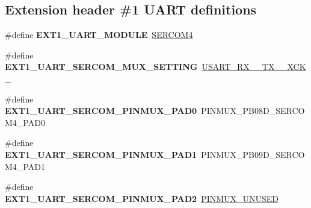 \subsection*{Extension header \#1 U\+A\+R\+T definitions}
\begin{DoxyCompactItemize}
\item 
\hypertarget{group__saml21__xplained__pro__features__group_ga0926bf9254087738e85b09e734c4e7ca}{}\#define {\bfseries E\+X\+T1\+\_\+\+U\+A\+R\+T\+\_\+\+M\+O\+D\+U\+L\+E}~\hyperlink{group___s_a_m_l21_j18_a__base_gad48343faa88820b8f552aa1eaf66f00a}{S\+E\+R\+C\+O\+M4}\label{group__saml21__xplained__pro__features__group_ga0926bf9254087738e85b09e734c4e7ca}

\item 
\hypertarget{group__saml21__xplained__pro__features__group_ga1a806a0ca2b2d26a4e884ad7c2d68b4d}{}\#define {\bfseries E\+X\+T1\+\_\+\+U\+A\+R\+T\+\_\+\+S\+E\+R\+C\+O\+M\+\_\+\+M\+U\+X\+\_\+\+S\+E\+T\+T\+I\+N\+G}~\hyperlink{group__asfdoc__sam0__sercom__usart__group_gga87bbdb9f7edb3f1866aeb498bf7c9077ac937b1e1063cc3d094c4534c022af703}{U\+S\+A\+R\+T\+\_\+\+R\+X\+\_\+\_\+\+T\+X\+\_\+\_\+\+X\+C\+K\+\_}\label{group__saml21__xplained__pro__features__group_ga1a806a0ca2b2d26a4e884ad7c2d68b4d}

\item 
\hypertarget{group__saml21__xplained__pro__features__group_ga55b432da33f107edf738cce079341010}{}\#define {\bfseries E\+X\+T1\+\_\+\+U\+A\+R\+T\+\_\+\+S\+E\+R\+C\+O\+M\+\_\+\+P\+I\+N\+M\+U\+X\+\_\+\+P\+A\+D0}~P\+I\+N\+M\+U\+X\+\_\+\+P\+B08\+D\+\_\+\+S\+E\+R\+C\+O\+M4\+\_\+\+P\+A\+D0\label{group__saml21__xplained__pro__features__group_ga55b432da33f107edf738cce079341010}

\item 
\hypertarget{group__saml21__xplained__pro__features__group_gade2f210effcd07813848e0b7d8830258}{}\#define {\bfseries E\+X\+T1\+\_\+\+U\+A\+R\+T\+\_\+\+S\+E\+R\+C\+O\+M\+\_\+\+P\+I\+N\+M\+U\+X\+\_\+\+P\+A\+D1}~P\+I\+N\+M\+U\+X\+\_\+\+P\+B09\+D\+\_\+\+S\+E\+R\+C\+O\+M4\+\_\+\+P\+A\+D1\label{group__saml21__xplained__pro__features__group_gade2f210effcd07813848e0b7d8830258}

\item 
\hypertarget{group__saml21__xplained__pro__features__group_ga3a24abc55a0d5948eec737e92c04d15d}{}\#define {\bfseries E\+X\+T1\+\_\+\+U\+A\+R\+T\+\_\+\+S\+E\+R\+C\+O\+M\+\_\+\+P\+I\+N\+M\+U\+X\+\_\+\+P\+A\+D2}~\hyperlink{group__asfdoc__sam0__sercom__usart__group_gaffde9ff712058ef836127e1f3368889e}{P\+I\+N\+M\+U\+X\+\_\+\+U\+N\+U\+S\+E\+D}\label{group__saml21__xplained__pro__features__group_ga3a24abc55a0d5948eec737e92c04d15d}


\end{DoxyCompactItemize}
